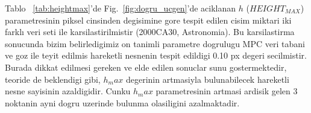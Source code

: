 \documentclass[review]{elsarticle}
\begin{document}
Tablo ~\ref{tab:heightmax}'de Fig.~\ref{fig:dogru_ucgen}'de aciklanan $h$ ($HEIGHT_{MAX}$) parametresinin piksel cinsinden degisimine gore tespit edilen cisim miktari iki farklı veri seti ile karsilastirilmistir (2000CA30, Astronomia). Bu karsilastirma sonucunda bizim belirledigimiz on tanimli parametre dogrulugu MPC veri tabani ve goz ile teyit edilmis hareketli nesnenin tespit edildigi 0.10 px degeri secilmistir. Burada dikkat edilmesi gereken ve elde edilen sonuclar sunu gostermektedir, teoride de beklendigi gibi, $h_max$ degerinin artmasiyla bulunabilecek hareketli nesne sayisinin azaldigidir. Cunku $h_max$ parametresinin artmasi ardisik gelen 3 noktanin ayni dogru uzerinde bulunma olasiligini azalmaktadir.

\begin{table}[H]
    \begin{subtable}[h]{0.45\textwidth}
        \centering
\end{subtable}
\end{table}
\end{document}
